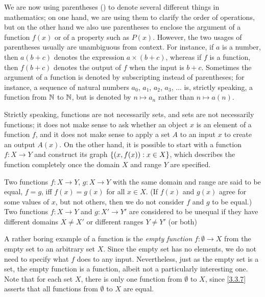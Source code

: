 \setcounter{thm}{4}
\begin{rmk}\label{3.3.5}
  We are now using parentheses () to denote several different things in mathematics;
  on one hand, we are using them to clarify the order of operations, but on the other hand we also use parentheses to enclose the argument of a function \(f(x)\) or of a property such as \(P(x)\).
  However, the two usages of parentheses usually are unambiguous from context.
  For instance, if \(a\) is a number, then \(a(b + c)\) denotes the expression \(a \times (b + c)\), whereas if \(f\) is a function, then \(f(b + c)\) denotes the output of \(f\) when the input is \(b + c\).
  Sometimes the argument of a function is denoted by subscripting instead of parentheses;
  for instance, a sequence of natural numbers \(a_0\), \(a_1\), \(a_2\), \(a_3\), \(\dots\) is, strictly speaking, a function from \(\mathbb{N}\) to \(\mathbb{N}\), but is denoted by \(n \mapsto a_n\) rather than \(n \mapsto a(n)\).
\end{rmk}

\begin{rmk}\label{3.3.6}
  Strictly speaking, functions are not necessarily sets, and sets are not necessarily functions;
  it does not make sense to ask whether an object \(x\) is an element of a function \(f\), and it does not make sense to apply a set \(A\) to an input \(x\) to create an output \(A(x)\).
  On the other hand, it is possible to start with a function \(f : X \to Y\) and construct its graph \(\left\lbrace(x, f(x)) : x \in X\right\rbrace\), which describes the function completely once the domain \(X\) and range \(Y\) are specified.
\end{rmk}

\begin{defn}\label{3.3.7}
  Two functions \(f : X \to Y\), \(g : X \to Y\) with the same domain and range are said to be equal, \(f = g\), iff \(f(x) = g(x)\) for all \(x \in X\).
  (If \(f(x)\) and \(g(x)\) agree for some values of \(x\), but not others, then we do not consider \(f\) and \(g\) to be equal.)
  Two functions \(f : X \to Y\) and \(g : X' \to Y'\) are considered to be unequal if they have different domains \(X \neq X'\) or different ranges \(Y \neq Y'\) (or both)
\end{defn}

\begin{note}
  A rather boring example of a function is the \emph{empty function} \(f : \emptyset \to X\) from the empty set to an arbitrary set \(X\).
  Since the empty set has no elements, we do not need to specify what \(f\) does to any input.
  Nevertheless, just as the empty set is a set, the empty function is a function, albeit not a particularly interesting one.
  Note that for each set \(X\), there is only one function from \(\emptyset\) to \(X\), since \cref{3.3.7} asserts that all functions from \(\emptyset\) to \(X\) are equal.
\end{note}

